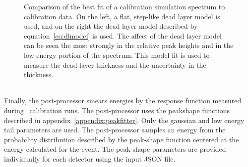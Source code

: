 \documentclass[/main.tex]{subfiles}
\begin{document}
\begin{figure}
  \centering
  \caption[Comparison of calibration simulation to data with different dead layer models]{\label{fig:calwithdl}
    Comparison of the best fit of a  calibration simulation spectrum to calibration data. On the left, a flat, step-like dead layer model is used, and on the right the dead layer model described by equation~\ref{eq:dlmodel} is used. The affect of the dead layer model can be seen the most strongly in the relative peak heights and in the low energy portion of the spectrum. This model fit is used to measure the dead layer thickness and the uncertainty in the thickness.
  }
\end{figure}
\\
Finally, the post-processor smears energies by the response function measured during \ calibration runs.
The post-processor uses the peakshape functions described in appendix~\ref{appendix:peakfitter}.
Only the gaussian and low energy tail parameters are used.
The post-processor samples an energy from the probability distribution described by the peak-shape function centered at the energy calculated for the event.
The peak-shape parameters are provided individually for each detector using the input JSON file.
\end{document}
